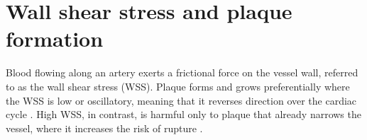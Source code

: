 
\section{Wall shear stress and plaque formation}
\label{sec:wss}

Blood flowing along an artery exerts a frictional force on the vessel wall, referred to as the wall shear stress (WSS).
Plaque forms and grows preferentially where the WSS is low or oscillatory, meaning that it reverses direction over the cardiac cycle \cite{chatzizisis2007ess,samady2011wss,yamamoto2017ess}.
High WSS, in contrast, is harmful only to plaque that already narrows the vessel, where it increases the risk of rupture \cite{bajraktari2021highwss,samady2011wss}.

